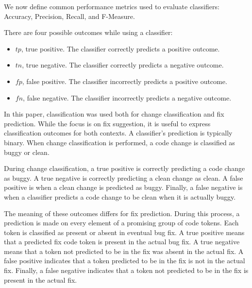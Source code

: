 \documentclass[10pt, conference, letterpaper, compsocconf]{IEEEtran}
\begin{document}
\par We now define common performance metrics used to evaluate classifiers:
Accuracy, Precision, Recall, and F-Measure.

There are four possible outcomes while using a classifier:
\begin{itemize}
  \item $tp$, true positive. The classifier correctly predicts a positive outcome.
  \item $tn$, true negative. The classifier correctly predicts a negative outcome.
  \item $fp$, false positive. The classifier incorrectly predicts a positive outcome.
  \item $fn$, false negative. The classifier incorrectly predicts a negative outcome.
\end{itemize}

In this paper, classification was used both for change classification and fix prediction. While the focus is on fix suggestion, 
it is useful to express classification outcomes for both contexts. A classifier's prediction is typically binary. When change classification is performed, a code change is classified as buggy or clean.

During change classification, a true positive is correctly predicting a code change as buggy. A true negative is correctly predicting a clean change as clean. 
A false positive is when a clean change is predicted as buggy. Finally, a false negative is when a classifier predicts a code change to be clean when it is actually buggy. 

The meaning of these outcomes differs for fix prediction. During this process, a prediction is made on every element of a promising group of code tokens. Each token is classified as present or absent in eventual bug fix. A true positive means that a predicted fix code token is present in the actual bug fix. A true negative means that a token not predicted to be in the fix was absent in the actual fix. 
A false positive indicates that a token predicted to be in the fix is not in the actual fix. Finally, a false negative indicates that a token not predicted to be in the fix is present in the actual fix.

%
\end{document}
